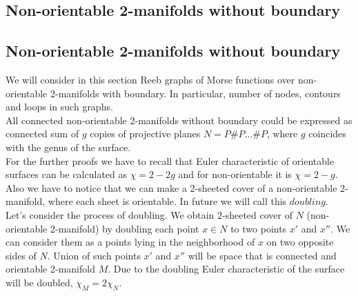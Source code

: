 \documentclass[]{article}
\begin{document}


\subsection{Non-orientable 2-manifolds without boundary}

\subsection{Non-orientable 2-manifolds without boundary}

We will consider in this section Reeb graphs of Morse functions over non-orientable 2-manifolds with boundary. In particular, number of nodes, contours and loops in such graphs. \\ 

All connected non-orientable 2-manifolds without boundary could be expressed as connected sum of  $g$ copies of projective planes $N=P\# P...\# P$, where $g$ coincides with the genus of the surface.\\

For the further proofs we have to recall that Euler characteristic of orientable surfaces can be calculated as $\chi=2-2g$ and for non-orientable it is $\chi=2-g$. Also we have to notice that we can make a 2-sheeted cover of a non-orientable 2-manifold, where each sheet is orientable. In future we will call this $doubling$. \\

Let's consider the process of doubling. We obtain 2-sheeted cover of $N$ (non-orientable 2-manifold) by doubling each point $x\in N$ to two points $x'$ and $x''$. We can consider them as a points lying in the neighborhood of $x$ on two opposite sides of $N$. Union of such points $x'$ and $x''$ will be space that is connected and orientable 2-manifold $M$. Due to the doubling Euler characteristic of the surface will be doubled, $\chi_M=2\chi_N$. \\
\end{document}
